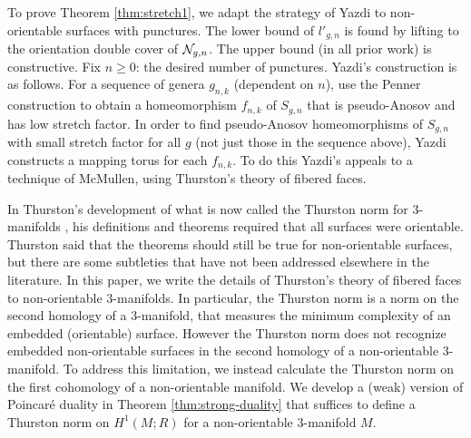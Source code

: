  To prove Theorem \ref{thm:stretch1}, we adapt the strategy of Yazdi \cite{yazdi2018pseudo} to non-orientable surfaces with punctures.  The lower bound of $l'_{g,n}$ is found by lifting to the orientation double cover of $\mathcal{N}_{g,n}$.  The upper bound (in all prior work) is constructive.  Fix $n\geq 0$: the desired number of punctures.  Yazdi's construction is as follows.  For a sequence of genera $g_{n,k}$ (dependent on $n$), use the Penner construction \cite{penner1988construction} to obtain a homeomorphism $f_{n,k}$ of $S_{g,n}$ that is pseudo-Anosov and has low stretch factor.  In order to find pseudo-Anosov homeomorphisms of $S_{g,n}$ with small stretch factor for all $g$ (not just those in the sequence above), Yazdi constructs a mapping torus for each $f_{n,k}$.  To do this Yazdi's appeals to a technique of McMullen, using Thurston's theory of fibered faces.  %

 In Thurston's development of what is now called the Thurston norm for 3-manifolds \cite{thurston1986norm}, his definitions and theorems required that all surfaces were orientable.  Thurston said that the theorems should still be true for non-orientable surfaces, but there are some subtleties that have not been addressed elsewhere in the literature.  In this paper, we write the details of Thurston's theory of fibered faces to non-orientable 3-manifolds.  In particular, the Thurston norm is a norm on the second homology of a 3-manifold, that measures the minimum complexity of an embedded (orientable) surface. However the Thurston norm does not recognize embedded non-orientable surfaces in the second homology of a non-orientable 3-manifold.  To address this limitation, we instead calculate the Thurston norm on the first cohomology of a non-orientable manifold.  We develop a (weak) version of Poincar\'e duality in Theorem \ref{thm:strong-duality} that suffices to define a Thurston norm on $H^1(M;R)$ for a non-orientable 3-manifold $M$.

